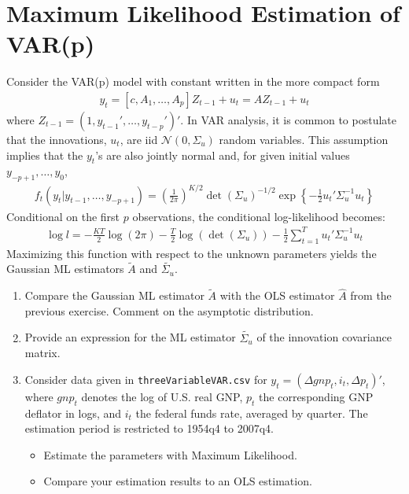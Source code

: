 \section[Maximum Likelihood Estimation of VAR{(p)}]{Maximum Likelihood Estimation of VAR{(p)}\label{ex:MaximumLikelihoodEstimationVARp}}
Consider the VAR{(p)} model with constant written in the more compact form
\begin{align*}
y_t = [c, A_1, \ldots, A_p] Z_{t-1} + u_t = A Z_{t-1}+ u_t
\end{align*}
where \(Z_{t-1}=(1,y_{t-1}',\ldots ,y_{t-p}')'\).
In VAR analysis, it is common to postulate that the innovations, \(u_t\), are iid \(\mathcal{N}(0,\Sigma_u)\) random variables.
This assumption implies that the \(y_t\)'s are also jointly normal
  and, for given initial values \(y_{-p+1},\ldots ,y_{0}\),
\begin{align*}
f_t(y_t|y_{t-1},\ldots ,y_{-p+1})={\left(\frac{1}{2\pi}\right)}^{K/2} {\det(\Sigma_u)}^{-1/2} \exp\left \{ -\frac{1}{2}u_t'\Sigma_u^{-1}u_t \right \}
\end{align*}
Conditional on the first \(p\) observations, the conditional log-likelihood becomes:
\begin{align*}
\log l = -\frac{KT}{2}\log(2\pi) - \frac{T}{2} \log(\det(\Sigma_u))- \frac{1}{2}\sum_{t=1}^T u_t'\Sigma_u^{-1}u_t
\end{align*}
Maximizing this function with respect to the unknown parameters
  yields the Gaussian ML estimators \(\widetilde{A}\) and \(\widetilde{\Sigma_u}\).

\begin{enumerate}
\item Compare the Gaussian ML estimator \(\widetilde{A}\) with the OLS estimator \(\widehat{A}\) from the previous exercise.
Comment on the asymptotic distribution.

\item Provide an expression for the ML estimator \(\widetilde{\Sigma_u}\) of the innovation covariance matrix.

\item Consider data given in \texttt{threeVariableVAR.csv} for \(y_t = (\Delta gnp_t,i_t,\Delta p_t)'\),
  where \(gnp_t\) denotes the log of U.S. real GNP,
  \(p_t\) the corresponding GNP deflator in logs,
  and \(i_t\) the federal funds rate, averaged by quarter.
The estimation period is restricted to 1954q4 to 2007q4. 
\begin{itemize}
\item Estimate the parameters with Maximum Likelihood.
\item Compare your estimation results to an OLS estimation.
\end{itemize}

\end{enumerate}

